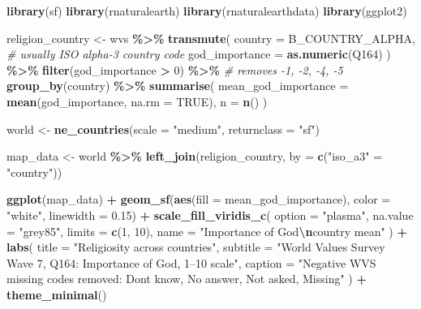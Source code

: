 \documentclass[
]{article}
\newenvironment{Shaded}{\begin{snugshade}}{\end{snugshade}}
\newcommand{\AttributeTok}[1]{\textcolor[rgb]{0.13,0.29,0.53}{#1}}
\newcommand{\CommentTok}[1]{\textcolor[rgb]{0.56,0.35,0.01}{\textit{#1}}}
\newcommand{\ConstantTok}[1]{\textcolor[rgb]{0.56,0.35,0.01}{#1}}
\newcommand{\DecValTok}[1]{\textcolor[rgb]{0.00,0.00,0.81}{#1}}
\newcommand{\FloatTok}[1]{\textcolor[rgb]{0.00,0.00,0.81}{#1}}
\newcommand{\FunctionTok}[1]{\textcolor[rgb]{0.13,0.29,0.53}{\textbf{#1}}}
\newcommand{\NormalTok}[1]{#1}
\newcommand{\OtherTok}[1]{\textcolor[rgb]{0.56,0.35,0.01}{#1}}
\newcommand{\SpecialCharTok}[1]{\textcolor[rgb]{0.81,0.36,0.00}{\textbf{#1}}}
\newcommand{\StringTok}[1]{\textcolor[rgb]{0.31,0.60,0.02}{#1}}
\begin{document}
\begin{Shaded}
\begin{Highlighting}[]
\FunctionTok{library}\NormalTok{(sf)}
\FunctionTok{library}\NormalTok{(rnaturalearth)}
\FunctionTok{library}\NormalTok{(rnaturalearthdata)}
\FunctionTok{library}\NormalTok{(ggplot2)}


\NormalTok{religion\_country }\OtherTok{\textless{}{-}}\NormalTok{ wvs }\SpecialCharTok{\%\textgreater{}\%}
  \FunctionTok{transmute}\NormalTok{(}
    \AttributeTok{country =}\NormalTok{ B\_COUNTRY\_ALPHA,   }\CommentTok{\# usually ISO alpha{-}3 country code}
    \AttributeTok{god\_importance =} \FunctionTok{as.numeric}\NormalTok{(Q164)}
\NormalTok{  ) }\SpecialCharTok{\%\textgreater{}\%}
  \FunctionTok{filter}\NormalTok{(god\_importance }\SpecialCharTok{\textgreater{}} \DecValTok{0}\NormalTok{) }\SpecialCharTok{\%\textgreater{}\%}  \CommentTok{\# removes {-}1, {-}2, {-}4, {-}5}
  \FunctionTok{group\_by}\NormalTok{(country) }\SpecialCharTok{\%\textgreater{}\%}
  \FunctionTok{summarise}\NormalTok{(}
    \AttributeTok{mean\_god\_importance =} \FunctionTok{mean}\NormalTok{(god\_importance, }\AttributeTok{na.rm =} \ConstantTok{TRUE}\NormalTok{),}
    \AttributeTok{n =} \FunctionTok{n}\NormalTok{()}
\NormalTok{  )}

\NormalTok{world }\OtherTok{\textless{}{-}} \FunctionTok{ne\_countries}\NormalTok{(}\AttributeTok{scale =} \StringTok{"medium"}\NormalTok{, }\AttributeTok{returnclass =} \StringTok{"sf"}\NormalTok{)}

\NormalTok{map\_data }\OtherTok{\textless{}{-}}\NormalTok{ world }\SpecialCharTok{\%\textgreater{}\%}
  \FunctionTok{left\_join}\NormalTok{(religion\_country, }\AttributeTok{by =} \FunctionTok{c}\NormalTok{(}\StringTok{"iso\_a3"} \OtherTok{=} \StringTok{"country"}\NormalTok{))}

\FunctionTok{ggplot}\NormalTok{(map\_data) }\SpecialCharTok{+}
  \FunctionTok{geom\_sf}\NormalTok{(}\FunctionTok{aes}\NormalTok{(}\AttributeTok{fill =}\NormalTok{ mean\_god\_importance), }\AttributeTok{color =} \StringTok{"white"}\NormalTok{, }\AttributeTok{linewidth =} \FloatTok{0.15}\NormalTok{) }\SpecialCharTok{+}
  \FunctionTok{scale\_fill\_viridis\_c}\NormalTok{(}
    \AttributeTok{option =} \StringTok{"plasma"}\NormalTok{,}
    \AttributeTok{na.value =} \StringTok{"grey85"}\NormalTok{,}
    \AttributeTok{limits =} \FunctionTok{c}\NormalTok{(}\DecValTok{1}\NormalTok{, }\DecValTok{10}\NormalTok{),}
    \AttributeTok{name =} \StringTok{"Importance of God}\SpecialCharTok{\textbackslash{}n}\StringTok{country mean"}
\NormalTok{  ) }\SpecialCharTok{+}
  \FunctionTok{labs}\NormalTok{(}
    \AttributeTok{title =} \StringTok{"Religiosity across countries"}\NormalTok{,}
    \AttributeTok{subtitle =} \StringTok{"World Values Survey Wave 7, Q164: Importance of God, 1–10 scale"}\NormalTok{,}
    \AttributeTok{caption =} \StringTok{"Negative WVS missing codes removed: Don\textquotesingle{}t know, No answer, Not asked, Missing"}
\NormalTok{  ) }\SpecialCharTok{+}
  \FunctionTok{theme\_minimal}\NormalTok{()}
\end{Highlighting}
\end{Shaded}
\end{document}
